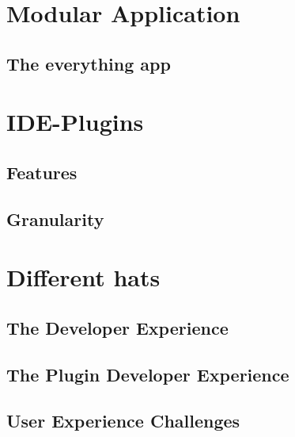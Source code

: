 \documentclass[runningheads]{llncs}
\begin{document}
\section{Modular Application}
\subsection{The everything app}
\section {IDE-Plugins}
\subsection{Features}
\subsection{Granularity}

\section{Different hats}
\subsection{The Developer Experience}
\subsection{The Plugin Developer Experience}
\subsection{User Experience Challenges}
\end{document}
